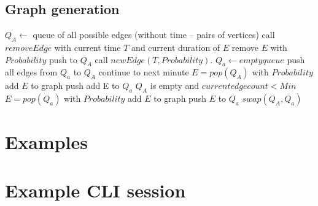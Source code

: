 \documentclass[11pt, a4paper,draft]{article}
\theoremstyle{plain}
\theoremstyle{definition}
\theoremstyle{remark}
\begin{document}
\subsection{Graph generation}
\label{sec:generator-generation}

\begin{algorithmic}[1]
    \State $Q_A \leftarrow$ queue of all possible edges (without time -- pairs of vertices)
            \State call $removeEdge$ with current time $T$ and current duration of $E$
            \State remove $E$ with $Probability$
             push to $Q_A$ \EndIf
        \EndFor
        \State call $newEdge( T, Probability )$.
        \State $Q_a \leftarrow empty queue$
                \State push all edges from $Q_a$ to $Q_A$
                \State continue to next minute
            \EndIf
            \State $E = pop( Q_A )$
            \State with $Probability$ add $E$ to graph
             push add E to $Q_a$ \EndIf
            \If $Q_A$ is empty and $current edge count < Min$
                    \State $E = pop( Q_a )$
                    \State with $Probability$ add $E$ to graph
                     push $E$ to $Q_a$ \EndIf
                \EndWhile
            \EndIf
        \EndWhile
        \State $swap( Q_A, Q_a )$ 
    \EndFor
\end{algorithmic}

\section{Examples}
\section{Example CLI session}
\label{sec:exmaple-cli}

\end{document}
